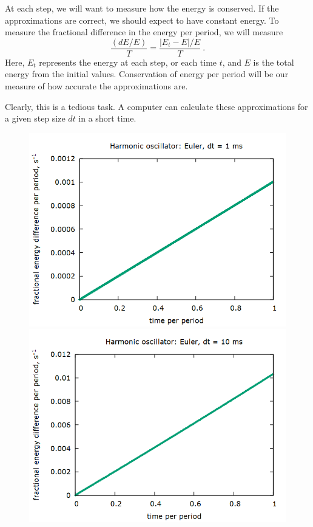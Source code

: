 \documentclass[aps,prl,twocolumn,superscriptaddress]{revtex4-1}
\newcommand{\cmod}[1]{\left| #1 \right|}	%
\begin{document}
At each step, we will want to measure how the energy is conserved. If the approximations are correct, we should expect to have constant energy. To measure the fractional difference in the energy per period, we will measure
\begin{equation}
\frac{(dE/E)}{T} = \frac{\cmod{E_t - E}/E}{T} \label{eqn:fracener} ~.
\end{equation}
Here, $E_t$ represents the energy at each step, or each time $t$, and $E$ is the total energy from the initial values. Conservation of energy per period will be our measure of how accurate the approximations are.

Clearly, this is a tedious task. A computer can calculate these approximations for a given step size $dt$ in a short time.

\begin{figure}[htbp]
  	\begin{center}
 		\includegraphics[scale=0.3]{h1.png}
 		\includegraphics[scale=0.3]{h10.png}

\end{center}
\end{figure}
\end{document}
